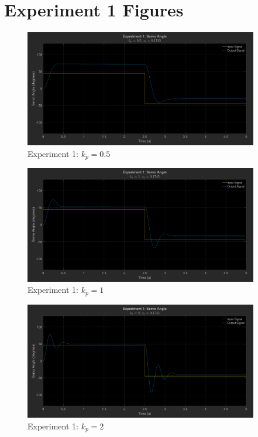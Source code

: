 \documentclass[12pt]{article}
\begin{document}


\clearpage
\appendix
\section{Experiment 1 Figures} \label{sec:exp1fig}
\begin{figure}[h]
    \centering
    \includegraphics[width=0.91\textwidth]{exp1_kp0.5}
    \caption{Experiment 1: $k_p = 0.5$}
\end{figure}
\begin{figure}[h]
    \centering
    \includegraphics[width=0.91\textwidth]{exp1_kp1}
    \caption{Experiment 1: $k_p = 1$}
\end{figure}
\begin{figure}[h]
    \centering
    \includegraphics[width=0.91\textwidth]{exp1_kp2}
    \caption{Experiment 1: $k_p = 2$}
\end{figure}
\end{document}
